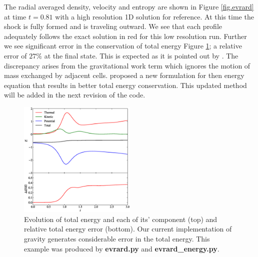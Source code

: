 The radial averaged density, velocity and entropy are shown in Figure \ref{fig.evrard} at time 
$t=0.81$ with a high resolution 1D solution for reference. At this time the shock is fully formed 
and is traveling outward. We see that each profile adequately follows the exact solution in red for 
this low resolution run. Further we see significant error in the conservation of total energy 
Figure \ref{fig.evrard_energy}; a relative error of $27\%$ at the final state. This is expected as 
it is pointed out by \cite{Springel2010}. The discrepancy arises from the gravitational work term 
which ignores the motion of mass exchanged by adjacent cells. \cite{Springel2010} proposed a new 
formulation for then energy equation that results in better total energy conservation. This updated 
method will be added in the next revision of the code.
\begin{figure}
    \begin{center}
        \includegraphics[width=0.5\textwidth]{figures/evrard_energy.eps}
        \caption{Evolution of total energy and each of its' component (top) and relative
        total energy error (bottom). Our current implementation of gravity generates 
        considerable error in the total energy. This example was produced by 
        \textbf{evrard.py} and \textbf{evrard\_energy.py}.}
        \label{fig.evrard_energy}
    \end{center}
\end{figure}

